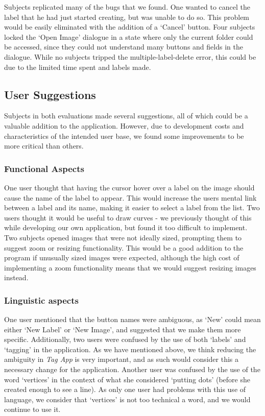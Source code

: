 \documentclass[11pt,twocolumn]{article}
\begin{document}
Subjects replicated many of the bugs that we found. One wanted to cancel the
label that he had just started creating, but was unable to do so. This problem
would be easily eliminated with the addition of a `Cancel' button. Four
subjects locked the `Open Image' dialogue in a state where only the current
folder could be accessed, since they could not understand many buttons and
fields in the dialogue. While no subjects tripped the multiple-label-delete
error, this could be due to the limited time spent and labels made.

\subsection{User Suggestions}

Subjects in both evaluations made several suggestions, all of which could be a
valuable addition to the application. However, due to development costs and
characteristics of the intended user base, we found some improvements to be
more critical than others.

\subsubsection{Functional Aspects}

One user thought that having the cursor hover over a label on the image should
cause the name of the label to appear. This would increase the users mental
link between a label and its name, making it easier to select a label from the
list. Two users thought it would be useful to draw curves - we previously
thought of this while developing our own application, but found it too
difficult to implement. Two subjects opened images that were not ideally sized,
prompting them to suggest zoom or resizing functionality. This would be a good
addition to the program if unusually sized images were expected, although the
high cost of implementing a zoom functionality means that we would suggest
resizing images instead.

\subsubsection{Linguistic aspects}

One user mentioned that the button names were ambiguous, as `New' could mean
either `New Label' or `New Image', and suggested that we make them more
specific. Additionally, two users were confused by the use of both `labels' and
`tagging' in the application. As we have mentioned above, we think reducing the
ambiguity in \emph{Tag App} is very important, and as such would consider this a
necessary change for the application. Another user was confused by the use of
the word `vertices' in the context of what she considered `putting dots'
(before she created enough to see a line). As only one user had problems with
this use of language, we consider that `vertices' is not too technical a word,
and we would continue to use it.
\end{document}
